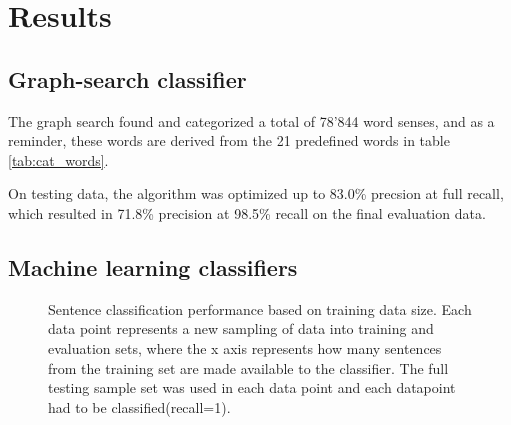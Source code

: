 \documentclass[a4paper,11pt]{kth-mag}
\begin{document}
\clearpage


\section{Results}

\subsection{Graph-search classifier}
The graph search found and categorized a total of 78'844 word senses, and as a reminder,
these words are derived from the 21 predefined words in table \ref{tab:cat_words}.

On testing data, the algorithm was optimized up to 83.0\% precsion at full recall,
which resulted in 71.8\% precision at 98.5\% recall on the final evaluation data.

\subsection{Machine learning classifiers}

\begin{figure}[h]
  \centering

  \caption{Sentence classification performance based on training data size. Each data point represents a new
    sampling of data into training and evaluation sets, where the x axis represents how many sentences from the
    training set are made available to the classifier. The full testing sample set was used in each data point and
    each datapoint had to be classified(recall=1).
  }
  \label{fig:data_size}
\end{figure}
\end{document}
